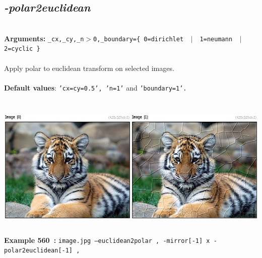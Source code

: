 \documentclass[a4paper,11pt,twoside]{book}
\begin{document}
\subsection{\emph{-polar2euclidean} }\vspace*{-0.5em}
~\\\textbf{Arguments: } 
{\small \texttt{\_cx,\_cy,\_n$>$0,\_boundary=\{ 0=dirichlet ~$|$~ 1=neumann ~$|$~ 2=cyclic \}}}\\~\\
Apply polar to euclidean transform on selected images.
~\\~\\\textbf{Default values}: {\small \texttt{'cx=cy=0.5', 'n=1'} and \texttt{'boundary=1'.}}
\begin{center}\includegraphics[keepaspectratio=true,height=7cm,width=\textwidth]{img/gmic_def560.jpg}\\
{\footnotesize \textbf{Example 560~:} \texttt{image.jpg --euclidean2polar , -mirror[-1] x -polar2euclidean[-1] ,}}
\end{center}
\end{document}
